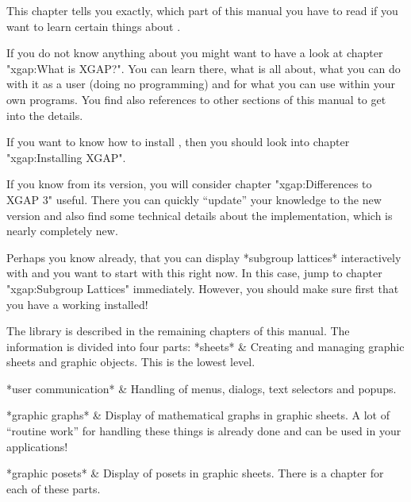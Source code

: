 
This chapter tells you exactly, which part of this manual you have to read
if you want to learn certain things about \XGAP.

If you do not know anything about {\XGAP} you might want to have a look at
chapter "xgap:What is XGAP?". You can learn there, what {\XGAP} is all
about, what you can do with it as a user (doing no programming) and for
what you can use {\XGAP} within your own programs. You find also references
to other sections of this manual to get into the details.

If you want to know how to install \XGAP, then you should look into 
chapter "xgap:Installing XGAP".

If you know {\XGAP} from its  version, you will consider chapter
"xgap:Differences to XGAP 3" useful. There you can quickly ``update'' your
knowledge to the new  version and also find some technical details
about the implementation, which is nearly completely new.

Perhaps you know already, that you can display *subgroup lattices*
interactively with {\XGAP} and you want to start with this right now. In
this case, jump to chapter "xgap:Subgroup Lattices"
immediately. However, you should make sure first that you have a working
{\XGAP} installed! 

The {\XGAP} library is described in the remaining chapters of this
manual. The information is divided into four parts:
\beginitems
*sheets* &
  Creating and managing graphic sheets and graphic objects. This is the
  lowest level.

*user communication* &
  Handling of menus, dialogs, text selectors and popups.

*graphic graphs* &
  Display of mathematical graphs in graphic sheets. A lot of ``routine
  work'' for handling these things is already done and can be used in
  your applications!

*graphic posets* &
  Display of posets in graphic sheets.
\enditems
There is a chapter for each of these parts.



